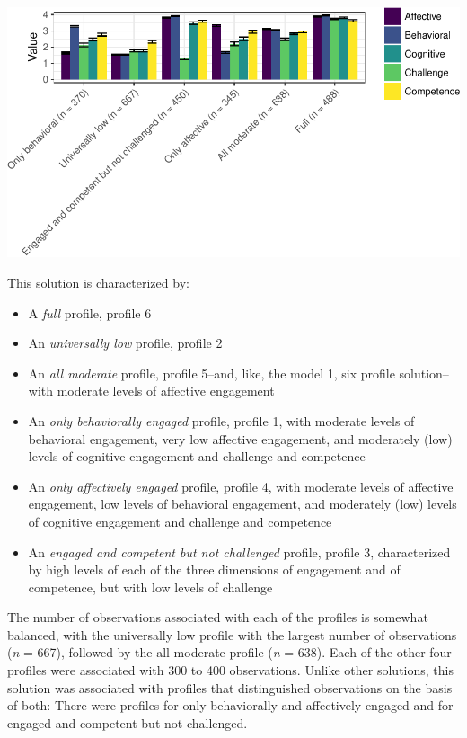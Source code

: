 \documentclass[]{msu-thesis}
\providecommand{\tightlist}{%
  \setlength{\itemsep}{0pt}\setlength{\parskip}{0pt}}
\theoremstyle{definition}
\theoremstyle{definition}
\theoremstyle{definition}
\theoremstyle{remark}
\begin{document}
\begin{center}\includegraphics[width=0.8\linewidth]{rosenberg-dissertation_files/figure-latex/unnamed-chunk-10-2} \end{center}

This solution is characterized by:

\begin{itemize}
\tightlist
\item
  A \emph{full} profile, profile 6
\item
  An \emph{universally low} profile, profile 2
\item
  An \emph{all moderate} profile, profile 5--and, like, the model 1, six
  profile solution--with moderate levels of affective engagement
\item
  An \emph{only behaviorally engaged} profile, profile 1, with moderate
  levels of behavioral engagement, very low affective engagement, and
  moderately (low) levels of cognitive engagement and challenge and
  competence
\item
  An \emph{only affectively engaged} profile, profile 4, with moderate
  levels of affective engagement, low levels of behavioral engagement,
  and moderately (low) levels of cognitive engagement and challenge and
  competence
\item
  An \emph{engaged and competent but not challenged} profile, profile 3,
  characterized by high levels of each of the three dimensions of
  engagement and of competence, but with low levels of challenge
\end{itemize}

The number of observations associated with each of the profiles is
somewhat balanced, with the universally low profile with the largest
number of observations (\emph{n} = 667), followed by the all moderate
profile (\emph{n} = 638). Each of the other four profiles were
associated with 300 to 400 observations. Unlike other solutions, this
solution was associated with profiles that distinguished observations on
the basis of both: There were profiles for only behaviorally and
affectively engaged and for engaged and competent but not challenged.
\end{document}
